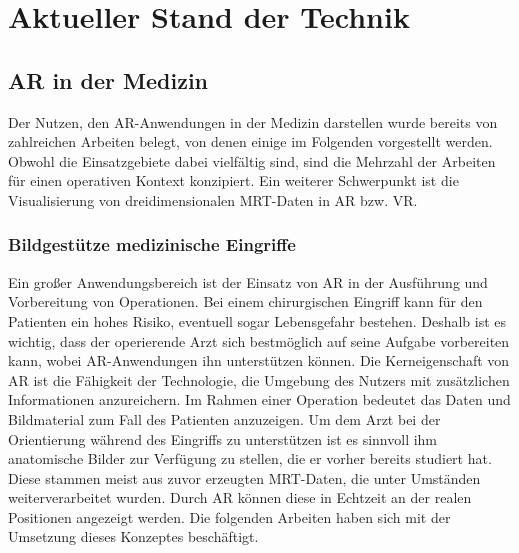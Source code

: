 
\chapter{Aktueller Stand der Technik}
\label{grundlagen}
\section{AR in der Medizin}												 %
\label{relatedAR}
Der Nutzen, den AR-Anwendungen in der Medizin darstellen wurde bereits von zahlreichen Arbeiten belegt, von denen einige im Folgenden vorgestellt werden. 
Obwohl die Einsatzgebiete dabei vielfältig sind, sind die Mehrzahl der Arbeiten für einen operativen Kontext konzipiert. Ein weiterer Schwerpunkt ist die Visualisierung von dreidimensionalen MRT-Daten in AR bzw. VR. %

\subsection{Bildgestütze medizinische Eingriffe}

Ein großer Anwendungsbereich ist der Einsatz von AR in der Ausführung und Vorbereitung von Operationen. Bei einem chirurgischen Eingriff kann für den Patienten ein hohes Risiko, eventuell sogar Lebensgefahr bestehen. Deshalb ist es wichtig, dass der operierende Arzt sich bestmöglich auf seine Aufgabe vorbereiten kann, wobei AR-Anwendungen ihn unterstützen können.
Die Kerneigenschaft von AR ist die Fähigkeit der Technologie, die Umgebung des Nutzers mit zusätzlichen Informationen anzureichern. Im Rahmen einer Operation bedeutet das Daten und Bildmaterial zum Fall des Patienten anzuzeigen. Um dem Arzt bei der Orientierung während des Eingriffs zu unterstützen ist es sinnvoll ihm anatomische Bilder zur Verfügung zu stellen, die er vorher bereits studiert hat. Diese stammen meist aus zuvor erzeugten MRT-Daten, die unter Umständen weiterverarbeitet wurden. Durch AR können diese in Echtzeit an der realen Positionen angezeigt werden. 
Die folgenden Arbeiten haben sich mit der Umsetzung dieses Konzeptes beschäftigt.


